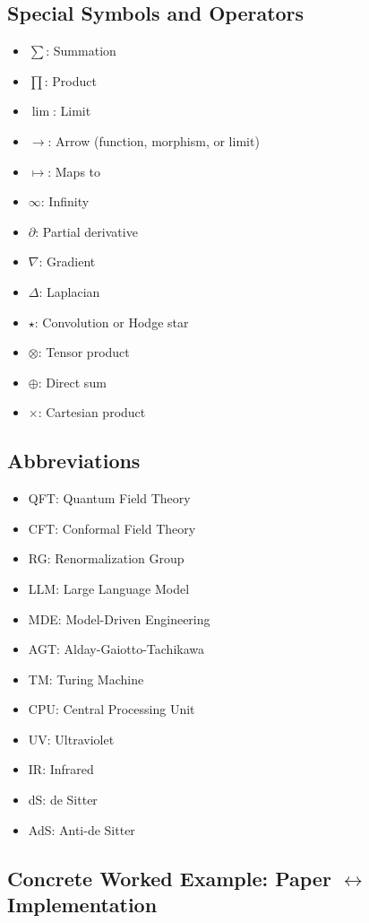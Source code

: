 \subsection{Special Symbols and Operators}
\begin{itemize}
\item $\sum$: Summation
\item $\prod$: Product
\item $\lim$: Limit
\item $\to$: Arrow (function, morphism, or limit)
\item $\mapsto$: Maps to
\item $\infty$: Infinity
\item $\partial$: Partial derivative
\item $\nabla$: Gradient
\item $\Delta$: Laplacian
\item $\star$: Convolution or Hodge star
\item $\otimes$: Tensor product
\item $\oplus$: Direct sum
\item $\times$: Cartesian product
\end{itemize}

\subsection{Abbreviations}
\begin{itemize}
\item QFT: Quantum Field Theory
\item CFT: Conformal Field Theory
\item RG: Renormalization Group
\item LLM: Large Language Model
\item MDE: Model-Driven Engineering
\item AGT: Alday-Gaiotto-Tachikawa
\item TM: Turing Machine
\item CPU: Central Processing Unit
\item UV: Ultraviolet
\item IR: Infrared
\item dS: de Sitter
\item AdS: Anti-de Sitter
\end{itemize}

\subsection{Concrete Worked Example: Paper $\leftrightarrow$ Implementation}

